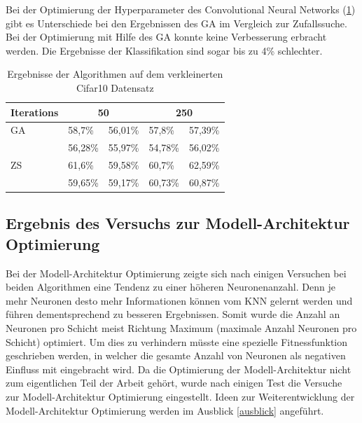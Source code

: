 Bei der Optimierung der Hyperparameter des Convolutional Neural Networks (\ref{tab:cnn_small}) gibt es Unterschiede bei den Ergebnissen des GA im Vergleich zur Zufallssuche. Bei der Optimierung mit Hilfe des GA konnte keine Verbesserung erbracht werden. Die Ergebnisse der Klassifikation sind sogar bis zu 4\% schlechter. 

\begin{table}
\centering
\caption{Ergebnisse der Algorithmen auf dem verkleinerten Cifar10 Datensatz}
\label{tab:cnn_small}
\begin{tabular}{lllll} 
\toprule
Iterations & \multicolumn{2}{c}{50} & \multicolumn{2}{c}{250}  \\ 
\midrule
GA         & 58,7\%  & 56,01\%      & 57,8\%     & 57,39\%            \\
           & 56,28\% & 55,97\%      & 54,78\%     & 56,02\%            \\
ZS         & 61,6\%  & 59,58\%      & 60,7\%  & 62,59\%        \\
           & 59,65\% & 59,17\%      & 60,73\% & 60,87\%        \\
\bottomrule
\end{tabular}
\end{table}


\subsection{Ergebnis des Versuchs zur Modell-Architektur Optimierung} \label{versuch_modell}
Bei der Modell-Architektur Optimierung zeigte sich nach einigen Versuchen bei beiden Algorithmen eine Tendenz zu einer höheren Neuronenanzahl. Denn je mehr Neuronen desto mehr Informationen können vom KNN gelernt werden und führen dementsprechend zu besseren Ergebnissen. Somit wurde die Anzahl an Neuronen pro Schicht meist Richtung Maximum (maximale Anzahl Neuronen pro Schicht) optimiert. Um dies zu verhindern müsste eine spezielle Fitnessfunktion geschrieben werden, in welcher die gesamte Anzahl von Neuronen als negativen Einfluss mit eingebracht wird. Da die Optimierung der Modell-Architektur nicht zum eigentlichen Teil der Arbeit gehört, wurde nach einigen Test die Versuche zur Modell-Architektur Optimierung eingestellt. Ideen zur Weiterentwicklung der Modell-Architektur Optimierung werden im Ausblick \ref{ausblick} angeführt.

\newpage

